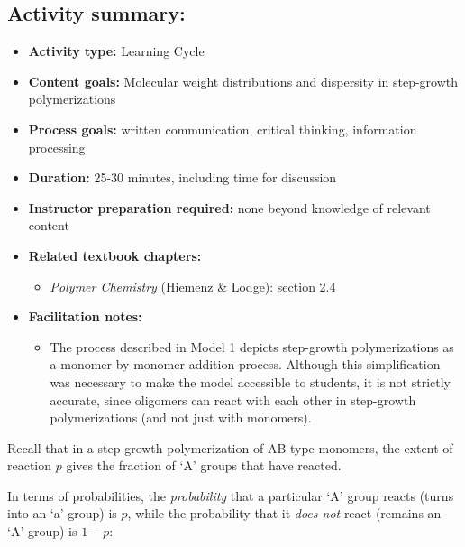 \begin{activity}
\begin{instructornotes}
	\subsection*{Activity summary:}
	\begin{itemize}
		\item \textbf{Activity type:} Learning Cycle
		\item \textbf{Content goals:} Molecular weight distributions and dispersity in step-growth polymerizations
		\item \textbf{Process goals:} %
			written communication, critical thinking, information processing
		\item \textbf{Duration:} 25-30 minutes, including time for discussion
		\item \textbf{Instructor preparation required:} none beyond knowledge of relevant content
		\item \textbf{Related textbook chapters:}
			\begin{itemize}
				\item \emph{Polymer Chemistry} (Hiemenz \& Lodge): section 2.4
			\end{itemize}
		\item \textbf{Facilitation notes:}
			\begin{itemize}
				\item The process described in Model 1 depicts step-growth polymerizations as a monomer-by-monomer addition process.  Although this simplification was necessary to make the model accessible to students, it is not strictly accurate, since oligomers can react with each other in step-growth polymerizations (and not just with monomers).
			\end{itemize}
	\end{itemize}

\end{instructornotes}


\begin{model}
\label{\labelbase:mdl:probabilities}

Recall that in a step-growth polymerization of AB-type monomers, the extent of reaction $p$ gives the fraction of `A' groups that have reacted.

In terms of probabilities, the \emph{probability} that a particular `A' group reacts (turns into an `a' group) is $p$, while the probability that it \emph{does not} react (remains an `A' group) is $1-p$:


\end{model}
\end{activity}

